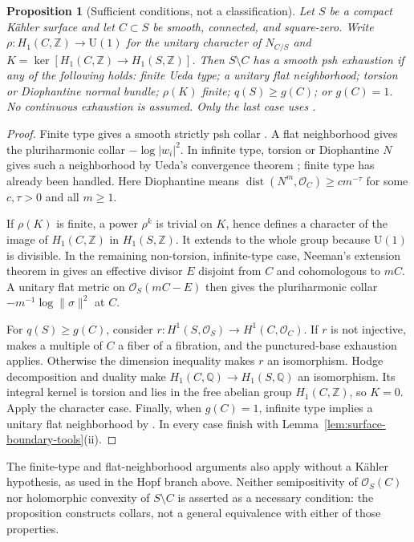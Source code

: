 \documentclass[11pt]{amsart}
\newtheorem{proposition}[theorem]{Proposition}
\theoremstyle{definition}
\theoremstyle{remark}
\numberwithin{equation}{section}
\newcommand{\OO}{\mathcal O}
\newcommand{\Uone}{\mathrm U(1)}
\begin{document}
\begin{proposition}[Sufficient conditions, not a classification]
\label{prop:surface-ueda-sufficient}
Let $S$ be a compact K\"ahler surface and let $C\subset S$ be smooth,
connected, and square-zero. Write $\rho:H_1(C,\mathbb Z)\to\Uone$
for the unitary character of $N_{C/S}$ and
$K=\ker[H_1(C,\mathbb Z)\to H_1(S,\mathbb Z)]$.
Then $S\setminus C$ has a smooth psh exhaustion if any of the following
holds: finite Ueda type; a unitary flat neighborhood; torsion or
Diophantine normal bundle; $\rho(K)$ finite; $q(S)\ge g(C)$; or
$g(C)=1$. No continuous exhaustion is assumed. Only the last case
uses \cite[Theorem~1.6]{CFSTZ2026}.
\end{proposition}
\begin{proof}
Finite type gives a smooth strictly psh collar
\cite[Theorem~2.5]{CLPT2018}. A flat neighborhood gives the
pluriharmonic collar $-\log|w_i|^2$. In infinite type, torsion or
Diophantine $N$ gives such a neighborhood by Ueda's convergence
theorem \cite[Theorem~3]{Ueda1983}; finite type has already been
handled. Here Diophantine means
$\operatorname{dist}(N^m,\OO_C)\ge c m^{-\tau}$ for some $c,\tau>0$
and all $m\ge1$.

If $\rho(K)$ is finite, a power $\rho^k$ is trivial on $K$, hence
defines a character of the image of $H_1(C,\mathbb Z)$ in
$H_1(S,\mathbb Z)$. It extends to the whole group because $\Uone$
is divisible. In the remaining non-torsion, infinite-type case,
Neeman's extension theorem in \cite[Theorem~4.4]{CLPT2018} gives an
effective divisor $E$ disjoint from $C$ and cohomologous to $mC$.
A unitary flat metric on $\OO_S(mC-E)$ then gives the pluriharmonic
collar $-m^{-1}\log\|\sigma\|^2$ at $C$.

For $q(S)\ge g(C)$, consider
$r:H^1(S,\OO_S)\to H^1(C,\OO_C)$. If $r$ is not injective,
\cite[Proposition~2.7]{CLPT2018} makes a multiple of $C$ a fiber of a
fibration, and the punctured-base exhaustion applies. Otherwise the
dimension inequality makes $r$ an isomorphism. Hodge decomposition
and duality make $H_1(C,\mathbb Q)\to H_1(S,\mathbb Q)$ an
isomorphism. Its integral kernel is torsion and lies in the free
abelian group $H_1(C,\mathbb Z)$, so $K=0$. Apply the character case.
Finally, when $g(C)=1$, infinite type implies a unitary flat
neighborhood by \cite[Theorem~1.6]{CFSTZ2026}. In every case finish
with Lemma~\ref{lem:surface-boundary-tools}\textup{(ii)}.
\end{proof}

The finite-type and flat-neighborhood arguments also apply without a
K\"ahler hypothesis, as used in the Hopf branch above. Neither
semipositivity of $\OO_S(C)$ nor holomorphic convexity of $S\setminus C$
is asserted as a necessary condition: the proposition constructs
collars, not a general equivalence with either of those properties.
\end{document}

